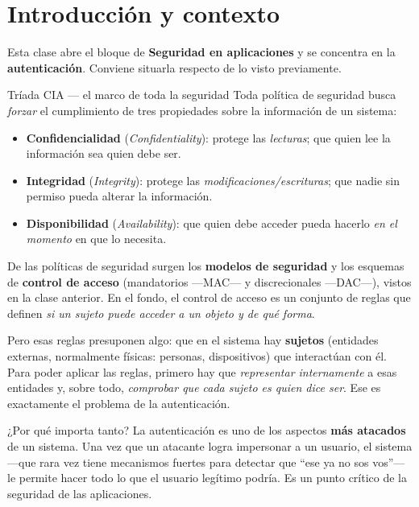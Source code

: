 \documentclass[11pt,a4paper]{article}
\begin{document}
\tableofcontents
\newpage

\section{Introducción y contexto}

Esta clase abre el bloque de \textbf{Seguridad en aplicaciones} y se concentra en la
\textbf{autenticación}. Conviene situarla respecto de lo visto previamente.

\begin{defbox}{Tríada CIA — el marco de toda la seguridad}
Toda política de seguridad busca \emph{forzar} el cumplimiento de tres propiedades sobre
la información de un sistema:
\begin{itemize}[leftmargin=1.4em,itemsep=2pt]
  \item \textbf{Confidencialidad} (\emph{Confidentiality}): protege las \emph{lecturas};
        que quien lee la información sea quien debe ser.
  \item \textbf{Integridad} (\emph{Integrity}): protege las \emph{modificaciones/escrituras};
        que nadie sin permiso pueda alterar la información.
  \item \textbf{Disponibilidad} (\emph{Availability}): que quien debe acceder pueda hacerlo
        \emph{en el momento} en que lo necesita.
\end{itemize}
\end{defbox}

De las políticas de seguridad surgen los \textbf{modelos de seguridad} y los esquemas de
\textbf{control de acceso} (mandatorios —MAC— y discrecionales —DAC—), vistos en la clase
anterior. En el fondo, el control de acceso es un conjunto de reglas que definen
\emph{si un sujeto puede acceder a un objeto y de qué forma}.

\medskip
Pero esas reglas presuponen algo: que en el sistema hay \textbf{sujetos} (entidades
externas, normalmente físicas: personas, dispositivos) que interactúan con él. Para poder
aplicar las reglas, primero hay que \emph{representar internamente} a esas entidades y, sobre
todo, \emph{comprobar que cada sujeto es quien dice ser}. Ese es exactamente el problema de
la autenticación.

\begin{warnbox}{¿Por qué importa tanto?}
La autenticación es uno de los aspectos \textbf{más atacados} de un sistema. Una vez que un
atacante logra impersonar a un usuario, el sistema —que rara vez tiene mecanismos fuertes
para detectar que ``ese ya no sos vos''— le permite hacer todo lo que el usuario legítimo
podría. Es un punto crítico de la seguridad de las aplicaciones.
\end{warnbox}
\end{document}
